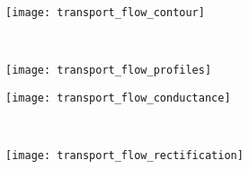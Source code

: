 %
\begin{figure*}[p]
  \centering
  
  \begin{minipage}[t]{6cm}
    \begin{subfigure}[t]{6cm}
      \centering
      \caption{}\vspace{-3mm}\label{fig:transport_flow_contour}
      \texttt{[image: transport\_flow\_contour]}
    \end{subfigure}
    \\
    \begin{subfigure}[t]{5.5cm}
      \centering
      \caption{}\vspace{-3mm}\label{fig:transport_flow_profiles}
      \texttt{[image: transport\_flow\_profiles]}
    \end{subfigure}
  \end{minipage}
  \hspace{0.25cm}
  \begin{minipage}[t]{5cm}
    \begin{subfigure}[t]{5cm}
      \centering
      \caption{}\vspace{-3mm}\label{fig:transport_flow_conductance}
      \texttt{[image: transport\_flow\_conductance]}
    \end{subfigure}
    \\
    \begin{subfigure}[t]{5cm}
      \centering
      \caption{}\vspace{-3mm}\label{fig:transport_flow_rectification}
      \texttt{[image: transport\_flow\_rectification]}
    \end{subfigure}
  \end{minipage}


\end{figure*}
